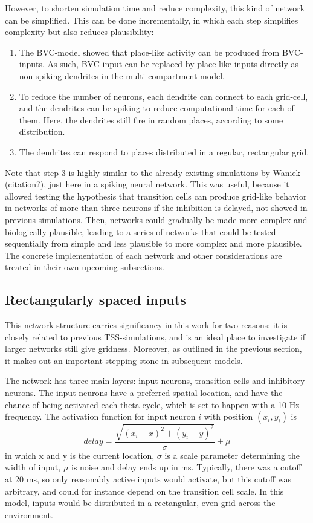 \documentclass{article}
\begin{document}
    However, to shorten simulation time and reduce complexity, this kind of network can be simplified. This can be done incrementally, in which each step simplifies complexity but also reduces plausibility:
    \begin{enumerate}
        \item The BVC-model showed that place-like activity can be produced from BVC-inputs. As such, BVC-input can be replaced by place-like inputs directly as non-spiking dendrites in the multi-compartment model. 
        \item To reduce the number of neurons, each dendrite can connect to each grid-cell, and the dendrites can be spiking to reduce computational time for each of them. Here, the dendrites still fire in random places, according to some distribution.
        \item The dendrites can respond to places distributed in a regular, rectangular grid.
    \end{enumerate}
 
    Note that step 3 is highly similar to the already existing simulations by Waniek (citation?), just here in a spiking neural network. This was useful, because it allowed testing the hypothesis that transition cells can produce grid-like behavior in networks of more than three neurons if the inhibition is delayed, not showed in previous simulations. Then, networks could gradually be made more complex and biologically plausible, leading to a series of networks that could be tested sequentially from simple and less plausible to more complex and more plausible. The concrete implementation of each network and other considerations are treated in their own upcoming subsections.

 

    \subsection{Rectangularly spaced inputs} 
    This network structure carries significancy in this work for two reasons: it is closely related to previous TSS-simulations, and is an ideal place to investigate if larger networks still give gridness. Moreover, as outlined in the previous section, it makes out an important stepping stone in subsequent models.
    
    The network has three main layers: input neurons, transition cells and inhibitory neurons. The input neurons have a preferred spatial location, and have the chance of being activated each theta cycle, which is set to happen with a 10 Hz frequency. The activation function for input neuron \(i\) with position \((x_i, y_i)\) is \begin{equation} \label{key1} delay = \frac{\sqrt{(x_i - x)^2 + (y_i - y)^2}}{\sigma} + \mu\end{equation}
    in which x and y is the current location, \(\sigma\) is a scale parameter determining the width of input, \(\mu\) is noise and delay ends up in ms. Typically, there was a cutoff at 20 ms, so only reasonably active inputs would activate, but this cutoff was arbitrary, and could for instance depend on the transition cell scale. In this model, inputs would be distributed in a rectangular, even grid across the environment.
    
\end{document}
